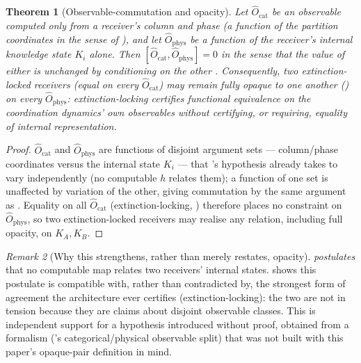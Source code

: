 \documentclass[11pt,twocolumn,a4paper]{article}
\theoremstyle{rdm}
\newtheorem{theorem}{Theorem}[section]
\theoremstyle{definition}
\theoremstyle{remark}
\newtheorem{remark}[theorem]{Remark}
\newcommand{\Know}{K}
\begin{document}
\begin{theorem}[Observable-commutation and opacity]
\label{thm:commutation-opacity}
Let $\hat O_{\mathrm{cat}}$ be an observable computed only from a
receiver's column and phase (a function of the partition coordinates in
the sense of \citet[Def.~16]{sachikonye-coordination-regimes}), and let
$\hat O_{\mathrm{phys}}$ be a function of the receiver's internal knowledge
state $\Know_i$ alone. Then
$[\hat O_{\mathrm{cat}},\hat O_{\mathrm{phys}}]=0$ in the sense that the
value of either is unchanged by conditioning on the other
\citep[Thm.~9]{sachikonye-coordination-regimes}. Consequently, two
extinction-locked receivers (equal on every $\hat O_{\mathrm{cat}}$) may
remain fully opaque to one another () on every
$\hat O_{\mathrm{phys}}$: extinction-locking certifies functional
equivalence on the coordination dynamics' own observables without
certifying, or requiring, equality of internal representation.
\end{theorem}

\begin{proof}
$\hat O_{\mathrm{cat}}$ and $\hat O_{\mathrm{phys}}$ are functions of
disjoint argument sets — column/phase coordinates versus the internal
state $\Know_i$ — that 's hypothesis already takes
to vary independently (no computable $h$ relates them); a function of one
set is unaffected by variation of the other, giving commutation by the
same argument as \citet[Thm.~9]{sachikonye-coordination-regimes}. Equality
on all $\hat O_{\mathrm{cat}}$ (extinction-locking,
) therefore places no constraint on
$\hat O_{\mathrm{phys}}$, so two extinction-locked receivers may realise
any relation, including full opacity, on $\Know_A,\Know_B$.
\end{proof}

\begin{remark}[Why this strengthens, rather than merely restates, opacity]
\label{rem:strengthens-opacity}
 \emph{postulates} that no computable map relates
two receivers' internal states.  shows this
postulate is compatible with, rather than contradicted by, the strongest
form of agreement the architecture ever certifies (extinction-locking): the
two are not in tension because they are claims about disjoint observable
classes. This is independent support for a hypothesis 
introduced without proof, obtained from a formalism
(\citet{sachikonye-coordination-regimes}'s categorical/physical observable
split) that was not built with this paper's opaque-pair definition in
mind.
\end{remark}
\end{document}
